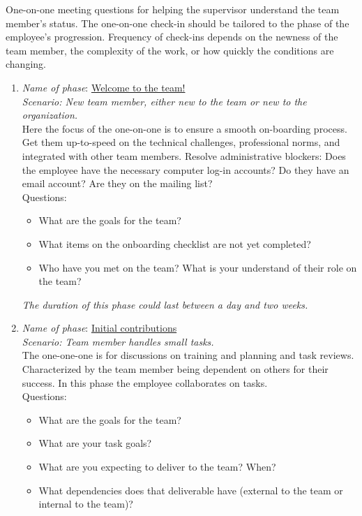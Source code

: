 One-on-one meeting questions for helping the supervisor understand the team member's status. 
The one-on-one check-in should be tailored to the phase of the employee's progression. Frequency of check-ins depends on the newness of the team member, the complexity of the work, or how quickly the conditions are changing.
\begin{enumerate}
    \item \textit{Name of phase}: \underline{Welcome to the team!}\\
    \textit{Scenario: New team member, either new to the team or new to the organization. }\\
    Here the focus of the one-on-one is to ensure a smooth on-boarding process. Get them up-to-speed on the technical challenges, professional norms, and integrated with other team members. Resolve administrative blockers: Does the employee have the necessary computer log-in accounts? Do they have an email account? Are they on the mailing list? \\
    Questions:
    \begin{itemize}
        \item What are the goals for the team?
        \item What items on the onboarding checklist are not yet completed?
        \item Who have you met on the team? What is your understand of their role on the team?
    \end{itemize}
\textit{The duration of this phase could last between a day and two weeks.}
    \item \textit{Name of phase}: \underline{Initial contributions}\\
    \textit{Scenario: Team member handles small tasks. }\\
    The one-one-one is for discussions on training and planning and task reviews. Characterized by the team member being dependent on others for their success. In this phase the employee collaborates on tasks.\\
    Questions:
    \begin{itemize}
        \item What are the goals for the team?
        \item What are your task goals?
        \item What are you expecting to deliver to the team? When? 
        \item What dependencies does that deliverable have (external to the team or internal to the team)?
    \end{itemize}

\end{enumerate}
